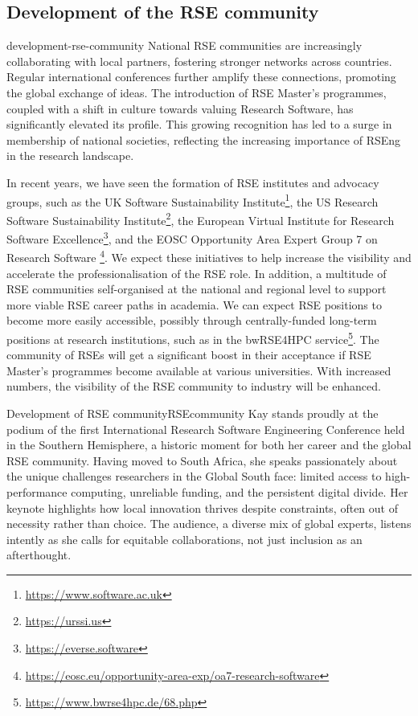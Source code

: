 \documentclass{eceasst}
\begin{document}
\subsection{Development of the RSE community}
\begin{whatis}{}{development-rse-community}
National RSE communities are increasingly collaborating with local partners,
fostering stronger networks across countries.
Regular international conferences further amplify these connections,
promoting the global exchange of ideas. The introduction of RSE Master's programmes,
coupled with a shift in culture towards valuing Research Software,
has significantly elevated its profile.
This growing recognition has led to a surge in membership of national societies,
reflecting the increasing importance of RSEng in the research landscape.
\end{whatis}
In recent years, we have seen the formation of RSE institutes and advocacy groups, such as
the UK Software Sustainability Institute\footnote{\url{https://www.software.ac.uk}},
the US Research Software Sustainability Institute\footnote{\url{https://urssi.us}},
the European Virtual Institute for Research Software Excellence\footnote{\url{https://everse.software}},
and the EOSC Opportunity Area Expert Group 7 on Research Software%
\footnote{\url{https://eosc.eu/opportunity-area-exp/oa7-research-software}}.
We expect these initiatives to help increase the visibility and accelerate
the professionalisation of the RSE role.
In addition, a multitude of RSE communities self-organised at the national
and regional level to support more viable RSE career paths in academia.
We can expect RSE positions to become more easily accessible,
possibly through centrally-funded long-term positions at research institutions,
such as in the bwRSE4HPC service\footnote{\url{https://www.bwrse4hpc.de/68.php}}.
The community of RSEs will get a significant boost in their acceptance
if RSE Master's programmes become available at various universities.
With increased numbers, the visibility of the RSE community to industry will be enhanced.
\begin{story}{Development of RSE community}{RSEcommunity}
Kay stands proudly at the podium of the first International Research
Software Engineering Conference held in the Southern Hemisphere,
a historic moment for both her career and the global RSE community.
Having moved to South Africa, she speaks passionately about the unique
challenges researchers in the Global South face: limited access
to high-performance computing, unreliable funding,
and the persistent digital divide.
Her keynote highlights how local innovation thrives despite constraints,
often out of necessity rather than choice.
The audience, a diverse mix of global experts, listens intently as she calls
for equitable collaborations, not just inclusion as an afterthought.
\end{story}
\end{document}
